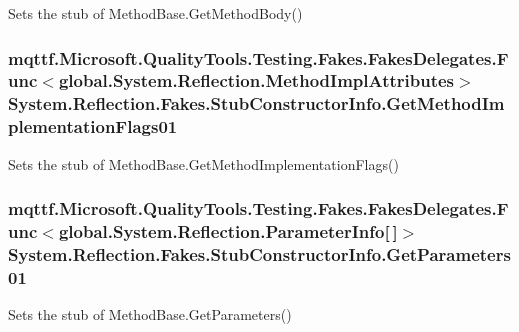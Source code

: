 Sets the stub of Method\-Base.\-Get\-Method\-Body()

\hypertarget{class_system_1_1_reflection_1_1_fakes_1_1_stub_constructor_info_af6e86bba7e387618e7cea23186ebd1d5}{
\subsubsection[{Get\-Method\-Implementation\-Flags01}]{\setlength{\rightskip}{0pt plus 5cm}mqttf.\-Microsoft.\-Quality\-Tools.\-Testing.\-Fakes.\-Fakes\-Delegates.\-Func$<$global.\-System.\-Reflection.\-Method\-Impl\-Attributes$>$ System.\-Reflection.\-Fakes.\-Stub\-Constructor\-Info.\-Get\-Method\-Implementation\-Flags01}}\label{class_system_1_1_reflection_1_1_fakes_1_1_stub_constructor_info_af6e86bba7e387618e7cea23186ebd1d5}


Sets the stub of Method\-Base.\-Get\-Method\-Implementation\-Flags()

\hypertarget{class_system_1_1_reflection_1_1_fakes_1_1_stub_constructor_info_a24b614ed1d8670ff0a151217a9115212}{
\subsubsection[{Get\-Parameters01}]{\setlength{\rightskip}{0pt plus 5cm}mqttf.\-Microsoft.\-Quality\-Tools.\-Testing.\-Fakes.\-Fakes\-Delegates.\-Func$<$global.\-System.\-Reflection.\-Parameter\-Info\mbox{[}$\,$\mbox{]}$>$ System.\-Reflection.\-Fakes.\-Stub\-Constructor\-Info.\-Get\-Parameters01}}\label{class_system_1_1_reflection_1_1_fakes_1_1_stub_constructor_info_a24b614ed1d8670ff0a151217a9115212}


Sets the stub of Method\-Base.\-Get\-Parameters()

